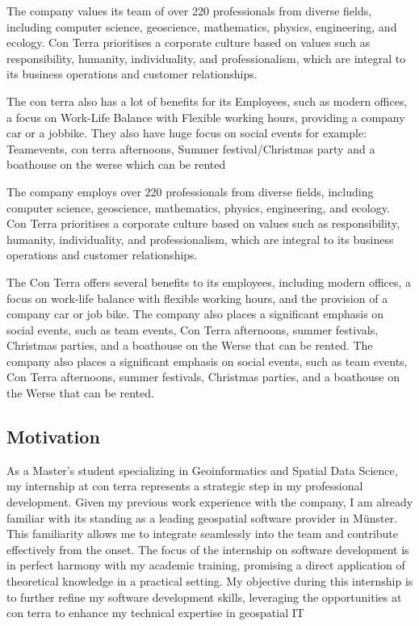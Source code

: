 \documentclass[11pt, titlepage, a4paper]{article}
\begin{document}
The company values its team of over 220 professionals from diverse fields, including computer science, geoscience, mathematics, physics, engineering, and ecology. Con Terra prioritises a corporate culture based on values such as responsibility, humanity, individuality, and professionalism, which are integral to its business operations and customer relationships.

The con terra also has a lot of benefits for its Employees, such as modern offices, a focus on Work-Life Balance with Flexible working hours, providing a company car or a jobbike. They also have huge focus on social events for example: Teamevents, con terra afternoons, Summer festival/Christmas party and a boathouse on the werse which can be rented


The company employs over 220 professionals from diverse fields, including computer science, geoscience, mathematics, physics, engineering, and ecology. Con Terra prioritises a corporate culture based on values such as responsibility, humanity, individuality, and professionalism, which are integral to its business operations and customer relationships.

The Con Terra offers several benefits to its employees, including modern offices, a focus on work-life balance with flexible working hours, and the provision of a company car or job bike. The company also places a significant emphasis on social events, such as team events, Con Terra afternoons, summer festivals, Christmas parties, and a boathouse on the Werse that can be rented. The company also places a significant emphasis on social events, such as team events, Con Terra afternoons, summer festivals, Christmas parties, and a boathouse on the Werse that can be rented.





\subsection{Motivation}
As a Master’s student specializing in Geoinformatics and Spatial Data Science, my internship at con terra represents a strategic step in my professional development. Given my previous work experience with the company, I am already familiar with its standing as a leading geospatial software provider in Münster. This familiarity allows me to integrate seamlessly into the team and contribute effectively from the onset. The focus of the internship on software development is in perfect harmony with my academic training, promising a direct application of theoretical knowledge in a practical setting. My objective during this internship is to further refine my software development skills, leveraging the opportunities at con terra to enhance my technical expertise in geospatial IT
\end{document}
